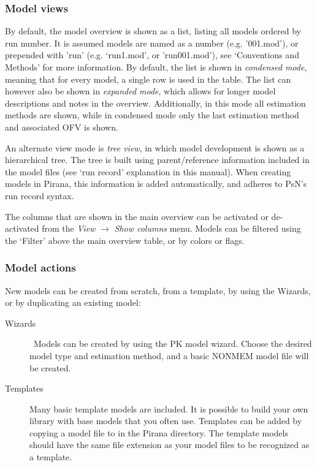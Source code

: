 {\subsubsection*{Model views}
By default, the model overview is shown as a list, listing all models
ordered by run number. It is assumed models are named as a number
(e.g. '001.mod'), or prepended with 'run' (e.g. `run1.mod', or 'run001.mod'), see
`Conventions and Methods' for more information. By default, the list is shown in \textit{condensed mode},
meaning that for every model, a single row is used in the table. The
list can however also be shown in \textit{expanded mode}, which allows
for longer model descriptions and notes in the overview. Additionally,
in this mode all estimation methods are shown, while in condensed mode
only the last estimation method and associated OFV is shown.

An alternate view mode is \textit{tree view}, in which model development is
shown as a hierarchical tree. The tree is built using parent/reference
information included in the model files (see `run record' explanation in this manual). When creating models in Pirana, this information is added automatically, and adheres to PsN's run record syntax.

The columns that are shown in the main overview can be activated or de-activated from the \textit{View} $\rightarrow$
\textit{Show columns} menu. Models can be filtered using the `Filter' above the
main overview table, or by colors or flags.

\subsubsection*{Model actions}
\noindent New models can be created from scratch, from a template, by
using the Wizards, or by duplicating an existing model:

\begin{description}
\item[Wizards]\ Models can be created by using the PK model
wizard. Choose the desired model type and estimation method, and a
basic NONMEM model file will be created.

\item[Templates] Many basic template models are included. It is
possible to build your own library with base models that you often
use. Templates can be added by copying a model file to
\normalfont in the Pirana directory. The
template models should have the same file extension as your model
files to be recognized as a template.


\end{description}}

